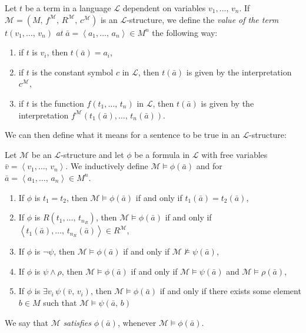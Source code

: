 \documentclass[../../main.tex]{subfiles}
\begin{document}
\begin{definition}\cite[1.3.13]{Cha90}
    Let $t$ be a term in a language $\mathcal{L}$ dependent on variables $v_1,\ldots,\, v_n$.
    If $\mathcal{M} = \left(M,\, f^{\mathcal{M}},\, R^{\mathcal{M}},\, c^{\mathcal{M}}\right)$ is an $\mathcal{L}$-structure,
    we define the \textit{value of the term} $t(v_1,\ldots,\, v_n)$ \textit{at} $\bar{a} = \left<a_1,\ldots,\, a_n\right> \in M^n$ the following way:
    \begin{enumerate}
        \item if $t$ is $v_i$, then $t(\bar{a}) = a_i$,
        \item if $t$ is the constant symbol $c$ in $\mathcal{L}$, 
        then $t(\bar{a})$ is given by the interpretation $c^{\mathcal{M}}$,
        \item if $t$ is the function $f(t_1,\ldots,\, t_n)$ in $\mathcal{L}$,
        then $t(\bar{a})$ is given by the interpretation 
        $f^{\mathcal{M}}(t_1(\bar{a}),\ldots,\, t_n(\bar{a}))$.
    \end{enumerate}
\end{definition}

We can then define what it means for a sentence to be true in an $\mathcal{L}$-structure:
\begin{definition}\cite[Definition 1.1.6]{Mar02}
    Let $\mathcal{M}$ be an $\mathcal{L}$-structure and let $\phi$ be a formula in $\mathcal{L}$ with free variables $\bar{v} = \left<v_1,\ldots,\, v_n\right>$.
    We inductively define $\mathcal{M} \models \phi(\bar{a})$ and for $\bar{a} = \left<a_1,\ldots,\, a_n\right> \in M^n$.

    \begin{enumerate}
        \item If $\phi$ is $t_1 = t_2$,
        then $\mathcal{M} \models \phi(\bar{a})$ if and only if $t_1(\bar{a}) = t_2(\bar{a})$, 
        \item If $\phi$ is $R\left(t_1,\ldots,\, t_{n_R}\right)$,
        then $\mathcal{M} \models \phi(\bar{a})$ if and only if $\left<t_1(\bar{a}),\ldots,\, t_{n_R}(\bar{a})\right> \in R^{\mathcal{M}}$,
        \item If $\phi$ is $\lnot \psi$, 
        then $\mathcal{M} \models \phi(\bar{a})$ if and only if $\mathcal{M} \not\models \psi(\bar{a})$,
        \item If $\phi$ is $\psi \wedge \rho$, 
        then $\mathcal{M} \models \phi(\bar{a})$ if and only if $\mathcal{M} \models \psi(\bar{a})$ and $\mathcal{M} \models \rho(\bar{a})$,
        \item If $\phi$ is $\exists v_i\, \psi(\bar{v},\, v_i)$,
        then $\mathcal{M} \models \phi(\bar{a})$ if and only if there exists some element $b \in M$ such that $\mathcal{M} \models \psi(\bar{a},\, b)$
    \end{enumerate}

    We say that $\mathcal{M}$ \textit{satisfies} $\phi(\bar{a})$, whenever $\mathcal{M} \models \phi(\bar{a})$.
\end{definition}
\end{document}

